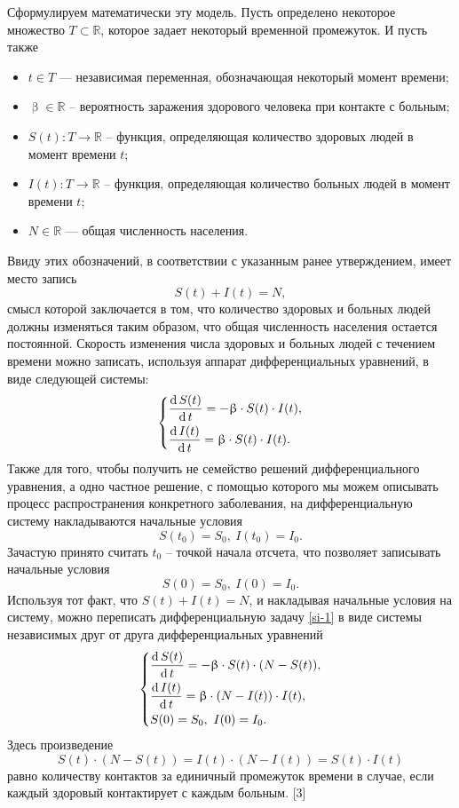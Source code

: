 \documentclass[a4paper, 14pt]{extreport}
\renewcommand{\beta}{\upbeta}
\renewcommand{\d}{\operatorname{d}}
\begin{document}
	Сформулируем математически эту модель. Пусть определено некоторое множество $T \subset \mathbb R$, которое задает некоторый временной промежуток. И пусть также
	\begin{itemize}
		\item $t \in T$ --- независимая переменная, обозначающая некоторый момент времени;
		\item $\beta \in \mathbb R$ -- вероятность заражения здорового человека при контакте с больным;
		\item $S(t) : T \to \mathbb R$ -- функция, определяющая количество здоровых людей в момент времени $t$; 
		\item $I(t): T \to \mathbb R$ -- функция, определяющая количество больных людей в момент времени $t$;
		\item $N \in \mathbb R$ --- общая численность населения.
	\end{itemize}
	Ввиду этих обозначений, в соответствии с указанным ранее утверждением, имеет место запись 
	\begin{equation*}
	S(t) + I(t) = N,
	\end{equation*}
	смысл которой заключается в том, что количество здоровых и больных людей должны изменяться таким образом, что общая численность населения остается постоянной.
	Скорость изменения числа здоровых и больных людей с течением времени можно записать, используя аппарат дифференциальных уравнений, в виде следующей системы:
	\begin{eqnarray}
		\label{si-1}
		\begin{dcases}
				\dfrac{\d S(t)}{\d t} = -\beta\cdot S(t)\cdot I(t),\\
				\dfrac{\d I(t)}{\d t} = \beta\cdot S(t)\cdot I(t).
		\end{dcases}
	\end{eqnarray}
	Также для того, чтобы получить не семейство решений дифференциального уравнения, а одно частное решение, с помощью которого мы можем описывать процесс распространения конкретного заболевания, на дифференциальную систему накладываются  начальные условия
	$$
		S(t_0) = S_0,\ I(t_0) = I_0.
	$$
	Зачастую принято считать $t_0$ -- точкой начала отсчета, что позволяет записывать начальные условия
	\begin{equation}
		S(0) = S_0,\ I(0) = I_0.
	\end{equation}
	Используя тот факт, что $S(t) + I(t) = N$,  и накладывая начальные условия на систему, можно переписать дифференциальную задачу \eqref{si-1} в виде системы независимых друг от друга дифференциальных уравнений
	\begin{eqnarray}
		\label{si-2}
		\begin{dcases}
		\dfrac{\d S(t)}{\d t} = -\beta \cdot S(t)\cdot (N - S(t)),\\
		\dfrac{\d I(t)}{\d t} = \beta\cdot (N - I(t))\cdot I(t),\\
		S(0) = S_0,\ I(0) = I_0.
		\end{dcases}
	\end{eqnarray}
	Здесь произведение 
	$$S(t) \cdot (N - S(t)) = I(t)\cdot (N - I(t)) = S(t)\cdot I(t)$$
	равно количеству контактов за единичный промежуток времени в случае, если каждый здоровый контактирует с каждым больным. [3]
	
\end{document}
